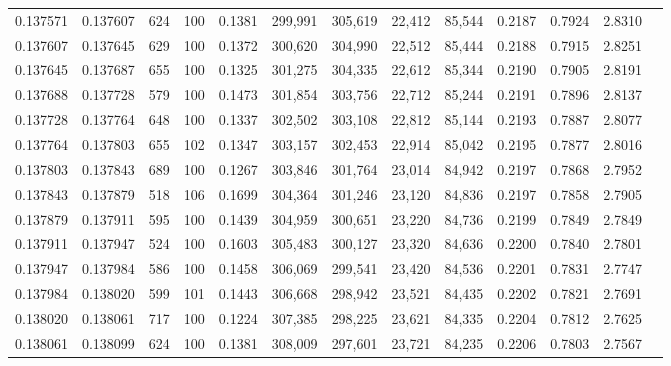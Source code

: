 \begin{tabular}{rrrrrrrrrrrrr}
0.137571 & 0.137607 &   624 & 100 &                                     0.1381 & 299,991 & 305,619 &  22,412 &  85,544 & 0.2187 & 0.7924 & 2.8310 \\
0.137607 & 0.137645 &   629 & 100 &                                     0.1372 & 300,620 & 304,990 &  22,512 &  85,444 & 0.2188 & 0.7915 & 2.8251 \\
0.137645 & 0.137687 &   655 & 100 &                                     0.1325 & 301,275 & 304,335 &  22,612 &  85,344 & 0.2190 & 0.7905 & 2.8191 \\
0.137688 & 0.137728 &   579 & 100 &                                     0.1473 & 301,854 & 303,756 &  22,712 &  85,244 & 0.2191 & 0.7896 & 2.8137 \\
0.137728 & 0.137764 &   648 & 100 &                                     0.1337 & 302,502 & 303,108 &  22,812 &  85,144 & 0.2193 & 0.7887 & 2.8077 \\
0.137764 & 0.137803 &   655 & 102 &                                     0.1347 & 303,157 & 302,453 &  22,914 &  85,042 & 0.2195 & 0.7877 & 2.8016 \\
0.137803 & 0.137843 &   689 & 100 &                                     0.1267 & 303,846 & 301,764 &  23,014 &  84,942 & 0.2197 & 0.7868 & 2.7952 \\
0.137843 & 0.137879 &   518 & 106 &                                     0.1699 & 304,364 & 301,246 &  23,120 &  84,836 & 0.2197 & 0.7858 & 2.7905 \\
0.137879 & 0.137911 &   595 & 100 &                                     0.1439 & 304,959 & 300,651 &  23,220 &  84,736 & 0.2199 & 0.7849 & 2.7849 \\
0.137911 & 0.137947 &   524 & 100 &                                     0.1603 & 305,483 & 300,127 &  23,320 &  84,636 & 0.2200 & 0.7840 & 2.7801 \\
0.137947 & 0.137984 &   586 & 100 &                                     0.1458 & 306,069 & 299,541 &  23,420 &  84,536 & 0.2201 & 0.7831 & 2.7747 \\
0.137984 & 0.138020 &   599 & 101 &                                     0.1443 & 306,668 & 298,942 &  23,521 &  84,435 & 0.2202 & 0.7821 & 2.7691 \\
0.138020 & 0.138061 &   717 & 100 &                                     0.1224 & 307,385 & 298,225 &  23,621 &  84,335 & 0.2204 & 0.7812 & 2.7625 \\
0.138061 & 0.138099 &   624 & 100 &                                     0.1381 & 308,009 & 297,601 &  23,721 &  84,235 & 0.2206 & 0.7803 & 2.7567 \\

\end{tabular}
